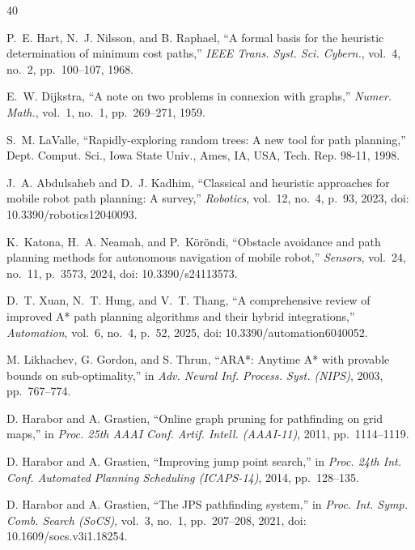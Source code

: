 \documentclass[lettersize,journal]{IEEEtran}
\begin{document}
\begin{thebibliography}{40}

P.~E. Hart, N.~J. Nilsson, and B. Raphael, ``A formal basis for the heuristic determination of minimum cost paths,'' \textit{IEEE Trans. Syst. Sci. Cybern.}, vol.~4, no.~2, pp.~100--107, 1968.



E.~W. Dijkstra, ``A note on two problems in connexion with graphs,'' \textit{Numer. Math.}, vol.~1, no.~1, pp.~269--271, 1959.



S.~M. LaValle, ``Rapidly-exploring random trees: A new tool for path planning,'' Dept. Comput. Sci., Iowa State Univ., Ames, IA, USA, Tech. Rep. 98-11, 1998.



J.~A. Abdulsaheb and D.~J. Kadhim, ``Classical and heuristic approaches for mobile robot path planning: A survey,'' \textit{Robotics}, vol.~12, no.~4, p.~93, 2023, doi: 10.3390/robotics12040093.



K.~Katona, H.~A. Neamah, and P.~K\"or\"ondi, ``Obstacle avoidance and path planning methods for autonomous navigation of mobile robot,'' \textit{Sensors}, vol.~24, no.~11, p.~3573, 2024, doi: 10.3390/s24113573.



D.~T. Xuan, N.~T. Hung, and V.~T. Thang, ``A comprehensive review of improved A* path planning algorithms and their hybrid integrations,'' \textit{Automation}, vol.~6, no.~4, p.~52, 2025, doi: 10.3390/automation6040052.



M. Likhachev, G. Gordon, and S. Thrun, ``ARA*: Anytime A* with provable bounds on sub-optimality,'' in \textit{Adv. Neural Inf. Process. Syst. (NIPS)}, 2003, pp.~767--774.



D. Harabor and A. Grastien, ``Online graph pruning for pathfinding on grid maps,'' in \textit{Proc. 25th AAAI Conf. Artif. Intell. (AAAI-11)}, 2011, pp.~1114--1119.



D. Harabor and A. Grastien, ``Improving jump point search,'' in \textit{Proc. 24th Int. Conf. Automated Planning Scheduling (ICAPS-14)}, 2014, pp.~128--135.



D. Harabor and A. Grastien, ``The JPS pathfinding system,'' in \textit{Proc. Int. Symp. Comb. Search (SoCS)}, vol.~3, no.~1, pp.~207--208, 2021, doi: 10.1609/socs.v3i1.18254.



\end{thebibliography}
\end{document}
